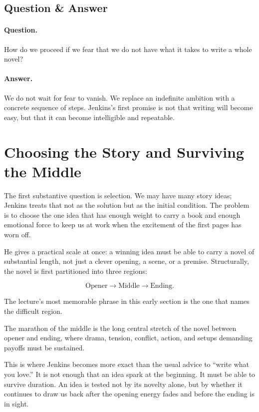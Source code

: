 \subsection{Question \& Answer}

\paragraph{Question.} How do we proceed if we fear that we do not have what it takes to write a whole novel?

\paragraph{Answer.} We do not wait for fear to vanish. We replace an indefinite ambition with a concrete sequence of steps. Jenkins's first promise is not that writing will become easy, but that it can become intelligible and repeatable.

\section{Choosing the Story and Surviving the Middle}

The first substantive question is selection. We may have many story ideas; Jenkins treats that not as the solution but as the initial condition. The problem is to choose the one idea that has enough weight to carry a book and enough emotional force to keep us at work when the excitement of the first pages has worn off.

He gives a practical scale at once: a winning idea must be able to carry a novel of substantial length, not just a clever opening, a scene, or a premise. Structurally, the novel is first partitioned into three regions:

\begin{equation}
\text{Opener} \to \text{Middle} \to \text{Ending}.
\end{equation}

The lecture's most memorable phrase in this early section is the one that names the difficult region.

\begin{definition}
The marathon of the middle is the long central stretch of the novel between opener and ending, where drama, tension, conflict, action, and setups demanding payoffs must be sustained.
\end{definition}

This is where Jenkins becomes more exact than the usual advice to ``write what you love.'' It is not enough that an idea spark at the beginning. It must be able to survive duration. An idea is tested not by its novelty alone, but by whether it continues to draw us back after the opening energy fades and before the ending is in sight.

